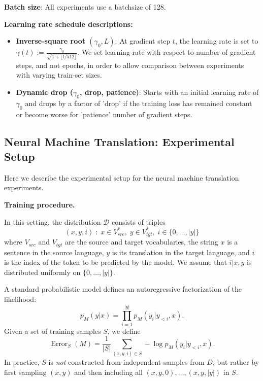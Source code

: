 \textbf{Batch size}: All experiments use a batchsize of 128.

\textbf{Learning rate schedule descriptions:}
\begin{itemize}
    \item \textbf{Inverse-square root $(\gamma_0, L)$}:
    At gradient step $t$, the learning rate is set to
    $\gamma(t) := \frac{\gamma_0}{\sqrt{1+\lfloor t / 512\rfloor}}$.
    We set learning-rate with respect to number of gradient steps, and not epochs, in order to allow comparison between experiments with varying train-set sizes.
    \item \textbf{Dynamic drop ($\gamma_0$, drop, patience)}: Starts with an initial learning rate of $\gamma_0$ and drops by a factor of 'drop' if the training loss has remained constant or become worse for 'patience' number of gradient steps.
\end{itemize}

\subsection{Neural Machine Translation: Experimental Setup}

Here we describe the experimental setup for the neural machine translation experiments.

{\bf Training procedure.}

In this setting, the distribution $\mathcal D$ consists of triples \[
    (x, y, i)\;:\;x \in V_{src}^*,\;y \in V_{tgt}^*,\;i \in \{0, \dots, |y|\}
\] where $V_{src}$ and $V_{tgt}$ are the source and target vocabularies, the string $x$ is a sentence in the source language, $y$ is its translation in the target language, and $i$ is the index of the token to be predicted by the model. We assume that $i|x, y$ is distributed uniformly on $\{0, \dots, |y|\}$.

A standard probabilistic model defines an autoregressive factorization of the likelihood: \[
    p_M(y|x) = \prod_{i = 1}^{|y|} p_M(y_i|y_{<i}, x).
\]
Given a set of training samples $S$, we define \[
    \operatorname{Error}_S(M) = \frac 1{|S|} \sum_{(x, y, i) \in S} -\log p_M(y_i|y_{<i}, x).
\]
In practice, $S$ is \textit{not} constructed from independent samples from $D$, but rather by first sampling $(x, y)$ and then including all $(x, y, 0), \dots, (x, y, |y|)$ in $S$. 

